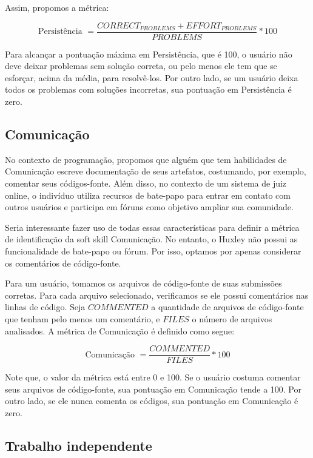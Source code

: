 Assim, propomos a métrica:

\begin{equation} \label{m:persistencia}
\mbox{Persistência } = \frac{ CORRECT_{PROBLEMS} + EFFORT_{PROBLEMS} }{ PROBLEMS } * 100
\end{equation}

Para alcançar a pontuação máxima em Persistência, que é 100, o usuário não deve deixar problemas sem solução correta, ou pelo menos ele tem que se esforçar, acima da média, para resolvê-los. Por outro lado, se um usuário deixa todos os problemas com soluções incorretas, sua pontuação em Persistência é zero.

\subsection{Comunicação}

No contexto de programação, propomos que alguém que tem habilidades de Comunicação escreve documentação de seus artefatos, costumando, por exemplo, comentar seus códigos-fonte. Além disso, no contexto de um sistema de juiz online, o indivíduo utiliza recursos de bate-papo para entrar em contato com outros usuários e participa em fóruns como objetivo ampliar sua comunidade.

Seria interessante fazer uso de todas essas características para definir a métrica de identificação da soft skill Comunicação. No entanto, o Huxley não possui as funcionalidade de bate-papo ou fórum. Por isso, optamos por apenas considerar os comentários de código-fonte.

Para um usuário, tomamos os arquivos de código-fonte de suas submissões corretas. Para cada arquivo selecionado, verificamos se ele possui comentários nas linhas de código. Seja $COMMENTED$ a quantidade de arquivos de código-fonte que tenham pelo menos um comentário, e $FILES$ o número de arquivos analisados. A métrica de Comunicação é definido como segue:

\begin{equation} \label{m:comunicacao}
\mbox{Comunicação } = \frac{ COMMENTED }{ FILES } * 100
\end{equation}

Note que, o valor da métrica está entre 0 e 100. Se o usuário costuma comentar seus arquivos de código-fonte, sua pontuação em Comunicação tende a 100. Por outro lado, se ele nunca comenta os códigos, sua pontuação em Comunicação é zero.

\subsection{Trabalho independente}

